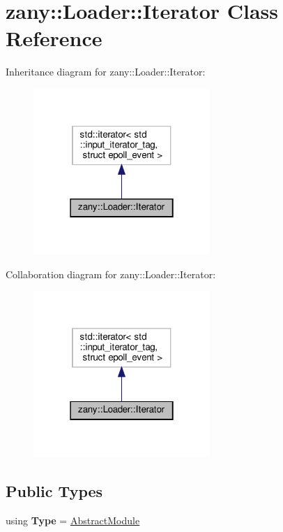 \hypertarget{classzany_1_1_loader_1_1_iterator}{}\section{zany\+:\+:Loader\+:\+:Iterator Class Reference}
\label{classzany_1_1_loader_1_1_iterator}


Inheritance diagram for zany\+:\+:Loader\+:\+:Iterator\+:
\nopagebreak
\begin{figure}[H]
\begin{center}
\leavevmode
\includegraphics[width=190pt]{classzany_1_1_loader_1_1_iterator__inherit__graph}
\end{center}
\end{figure}


Collaboration diagram for zany\+:\+:Loader\+:\+:Iterator\+:
\nopagebreak
\begin{figure}[H]
\begin{center}
\leavevmode
\includegraphics[width=190pt]{classzany_1_1_loader_1_1_iterator__coll__graph}
\end{center}
\end{figure}
\subsection*{Public Types}
\begin{DoxyCompactItemize}
\item 
\mbox{\label{classzany_1_1_loader_1_1_iterator_ac716f83cf96cf0b8ce7c29881ad80a21}} 
using {\bfseries Type} = \hyperlink{classzany_1_1_loader_1_1_abstract_module}{Abstract\+Module}
\end{DoxyCompactItemize}
